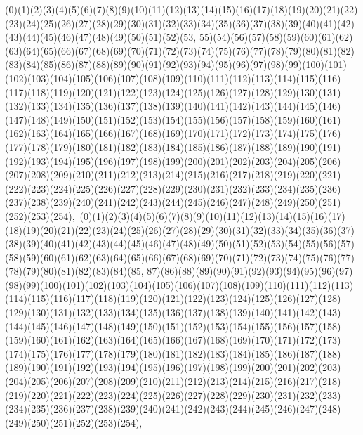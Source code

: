 \documentclass[12pt]{article}
\begin{document}
{(0)(1)(2)(3)(4)(5)(6)(7)(8)(9)(10)(11)(12)(13)(14)(15)(16)(17)(18)(19)(20)(21)(22)(23)(24)(25)(26)(27)(28)(29)(30)(31)(32)(33)(34)(35)(36)(37)(38)(39)(40)(41)(42)(43)(44)(45)(46)(47)(48)(49)(50)(51)(52)(53, 55)(54)(56)(57)(58)(59)(60)(61)(62)(63)(64)(65)(66)(67)(68)(69)(70)(71)(72)(73)(74)(75)(76)(77)(78)(79)(80)(81)(82)(83)(84)(85)(86)(87)(88)(89)(90)(91)(92)(93)(94)(95)(96)(97)(98)(99)(100)(101)(102)(103)(104)(105)(106)(107)(108)(109)(110)(111)(112)(113)(114)(115)(116)(117)(118)(119)(120)(121)(122)(123)(124)(125)(126)(127)(128)(129)(130)(131)(132)(133)(134)(135)(136)(137)(138)(139)(140)(141)(142)(143)(144)(145)(146)(147)(148)(149)(150)(151)(152)(153)(154)(155)(156)(157)(158)(159)(160)(161)(162)(163)(164)(165)(166)(167)(168)(169)(170)(171)(172)(173)(174)(175)(176)(177)(178)(179)(180)(181)(182)(183)(184)(185)(186)(187)(188)(189)(190)(191)(192)(193)(194)(195)(196)(197)(198)(199)(200)(201)(202)(203)(204)(205)(206)(207)(208)(209)(210)(211)(212)(213)(214)(215)(216)(217)(218)(219)(220)(221)(222)(223)(224)(225)(226)(227)(228)(229)(230)(231)(232)(233)(234)(235)(236)(237)(238)(239)(240)(241)(242)(243)(244)(245)(246)(247)(248)(249)(250)(251)(252)(253)(254)$
, 
$
(0)(1)(2)(3)(4)(5)(6)(7)(8)(9)(10)(11)(12)(13)(14)(15)(16)(17)(18)(19)(20)(21)(22)(23)(24)(25)(26)(27)(28)(29)(30)(31)(32)(33)(34)(35)(36)(37)(38)(39)(40)(41)(42)(43)(44)(45)(46)(47)(48)(49)(50)(51)(52)(53)(54)(55)(56)(57)(58)(59)(60)(61)(62)(63)(64)(65)(66)(67)(68)(69)(70)(71)(72)(73)(74)(75)(76)(77)(78)(79)(80)(81)(82)(83)(84)(85, 87)(86)(88)(89)(90)(91)(92)(93)(94)(95)(96)(97)(98)(99)(100)(101)(102)(103)(104)(105)(106)(107)(108)(109)(110)(111)(112)(113)(114)(115)(116)(117)(118)(119)(120)(121)(122)(123)(124)(125)(126)(127)(128)(129)(130)(131)(132)(133)(134)(135)(136)(137)(138)(139)(140)(141)(142)(143)(144)(145)(146)(147)(148)(149)(150)(151)(152)(153)(154)(155)(156)(157)(158)(159)(160)(161)(162)(163)(164)(165)(166)(167)(168)(169)(170)(171)(172)(173)(174)(175)(176)(177)(178)(179)(180)(181)(182)(183)(184)(185)(186)(187)(188)(189)(190)(191)(192)(193)(194)(195)(196)(197)(198)(199)(200)(201)(202)(203)(204)(205)(206)(207)(208)(209)(210)(211)(212)(213)(214)(215)(216)(217)(218)(219)(220)(221)(222)(223)(224)(225)(226)(227)(228)(229)(230)(231)(232)(233)(234)(235)(236)(237)(238)(239)(240)(241)(242)(243)(244)(245)(246)(247)(248)(249)(250)(251)(252)(253)(254)$
, 
$
}
\end{document}
